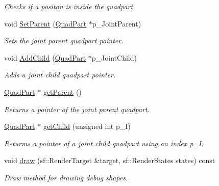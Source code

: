 \begin{DoxyCompactItemize}
\begin{DoxyCompactList}\small\item\em Checks if a positon is inside the quadpart. \end{DoxyCompactList}\item 
\mbox{\label{class_quad_part_a9dcdf03c207526585f6a7ab360c3b95d}} 
void \hyperlink{class_quad_part_a9dcdf03c207526585f6a7ab360c3b95d}{Set\+Parent} (\hyperlink{class_quad_part}{Quad\+Part} $\ast$p\+\_\+\+Joint\+Parent)
\begin{DoxyCompactList}\small\item\em Sets the joint parent quadpart pointer. \end{DoxyCompactList}\item 
\mbox{\label{class_quad_part_aa530277bca8174dc90ef2e3f322860ae}} 
void \hyperlink{class_quad_part_aa530277bca8174dc90ef2e3f322860ae}{Add\+Child} (\hyperlink{class_quad_part}{Quad\+Part} $\ast$p\+\_\+\+Joint\+Child)
\begin{DoxyCompactList}\small\item\em Adds a joint child quadpart pointer. \end{DoxyCompactList}\item 
\mbox{\label{class_quad_part_a9095c027b5a6794b34187fa7f228cf17}} 
\hyperlink{class_quad_part}{Quad\+Part} $\ast$ \hyperlink{class_quad_part_a9095c027b5a6794b34187fa7f228cf17}{get\+Parent} ()
\begin{DoxyCompactList}\small\item\em Returns a pointer of the joint parent quadpart. \end{DoxyCompactList}\item 
\mbox{\label{class_quad_part_a477fcd6f9c62b8b1522cc9f5bbd1c1c8}} 
\hyperlink{class_quad_part}{Quad\+Part} $\ast$ \hyperlink{class_quad_part_a477fcd6f9c62b8b1522cc9f5bbd1c1c8}{get\+Child} (unsigned int p\+\_\+I)
\begin{DoxyCompactList}\small\item\em Returms a pointer of a joint child quadpart using an index p\+\_\+I. \end{DoxyCompactList}\item 
\mbox{\label{class_quad_part_a6fd8400fe0915bd1029f7c2ef1b17096}} 
void \hyperlink{class_quad_part_a6fd8400fe0915bd1029f7c2ef1b17096}{draw} (sf\+::\+Render\+Target \&target, sf\+::\+Render\+States states) const
\begin{DoxyCompactList}\small\item\em Draw method for drawing debug shapes. \end{DoxyCompactList}\end{DoxyCompactItemize}

